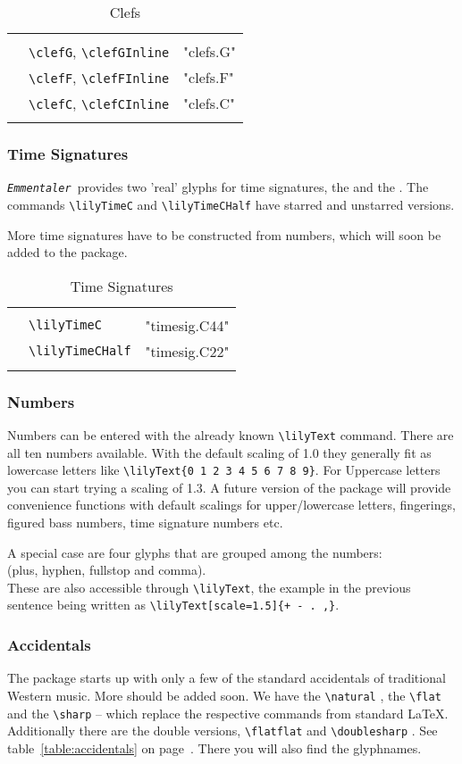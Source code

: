 \documentclass{article}
\newcommand*{\emmentaler}{\texttt{\textit{Emmentaler }}}
\newcommand*{\cmd}[1]{\texttt{\textbackslash #1}}
\newcommand{\tmpCaption}{} %
\newcommand{\tmpLabel}{}
\newenvironment{reftable}[2]
	{%
		\renewcommand{\tmpCaption}{#1}
		\renewcommand{\tmpLabel}{#2}
		\begin{table}[ht]
		\begin{center}
		\begin{tabular}[t]{lll}
		\hline
		&\\
	}
	{%
		&\\
		\hline
		\end{tabular}
		\caption{\tmpCaption}
		\label{table:\tmpLabel}
		\end{center}
		\end{table}
	}
\begin{document}
\begin{reftable}{Clefs}{clefs}
\clefGInline & \cmd{clefG}, \cmd{clefGInline} & "clefs.G"\\
\clefFInline & \cmd{clefF}, \cmd{clefFInline} & "clefs.F"\\
\clefCInline & \cmd{clefC}, \cmd{clefCInline} & "clefs.C"\\
\end{reftable}

\subsubsection{Time Signatures}
\emmentaler provides two 'real' glyphs for time signatures, the \lilyTimeC* and the \lilyTimeCHalf.
The commands \cmd{lilyTimeC} and \cmd{lilyTimeCHalf} have starred and unstarred versions. 

More time signatures have to be constructed from numbers, which will soon be added to the package.

\begin{reftable}{Time Signatures}{timesignatures}
\lilyTimeC & \cmd{lilyTimeC} & "timesig.C44"\\
\lilyTimeCHalf & \cmd{lilyTimeCHalf} & "timesig.C22"\\
\end{reftable}


\subsubsection{Numbers}
Numbers can be entered with the already known \cmd{lilyText} command. 
There are all ten numbers available. 
With the default scaling of 1.0 they generally fit as lowercase letters like  \cmd{lilyText\{0 1 2 3 4 5 6 7 8 9\}}. 
For Uppercase letters you can start trying a scaling of 1.3. A future version of the package will provide convenience functions with default scalings for upper/lowercase letters, fingerings, figured bass numbers, time signature numbers etc.

A special case are four glyphs that are grouped among the numbers:\\
 (plus, hyphen, fullstop and comma). \\
These are also accessible through \cmd{lilyText}, the example in the previous sentence being written as \cmd{lilyText[scale=1.5]\{+~-~.~,\}}.

\subsubsection{Accidentals}
The package starts up with only a few of the standard accidentals of traditional Western music. 
More should be added soon. 
We have the \cmd{natural} \natural, the \cmd{flat} \flat* and the \cmd{sharp} \sharp* -- which replace the respective commands from standard \LaTeX. 
Additionally there are the double versions, \cmd{flatflat} \flatflat* and \cmd{doublesharp} \doublesharp. See table~\ref{table:accidentals} on page~\pageref{table:accidentals}. 
There you will also find the glyphnames.
\end{document}
